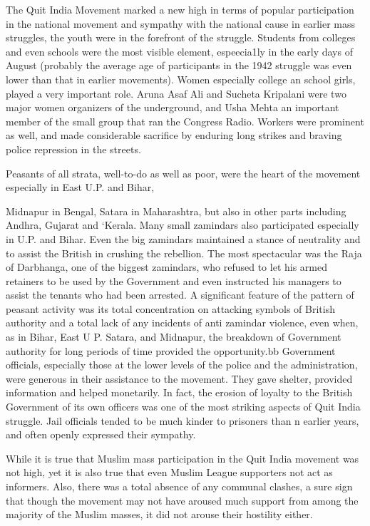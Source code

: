 The Quit India Movement marked a new high in terms of popular participation in the national movement and sympathy with the national cause in earlier mass struggles, the youth were in the forefront of the struggle. Students from colleges and even schools were the most visible element, espeecia1ly in the early days of August (probably the average age of participants in the 1942 struggle was even lower than that in earlier movements). Women especially college an school girls, played a very important role. Aruna Asaf Ali and Sucheta Kripalani were two major women organizers of the underground, and Usha Mehta an important member of the small group that ran the Congress Radio. Workers were prominent as well, and made considerable sacrifice by enduring long strikes and braving police repression in the streets.

Peasants of all strata, well-to-do as well as poor, were the heart of the movement especially in East U.P. and Bihar,

Midnapur in Bengal, Satara in Maharashtra, but also in other parts including Andhra, Gujarat and ‘Kerala. Many small zamindars also participated especially in U.P. and Bihar. Even the big zamindars maintained a stance of neutrality and to assist the British in crushing the rebellion. The most spectacular was the Raja of Darbhanga, one of the biggest zamindars, who refused to let his armed retainers to be used by the Government and even instructed his managers to assist the tenants who had been arrested. A significant feature of the pattern of peasant activity was its total concentration on attacking symbols of British authority and a total lack of any incidents of anti­ zamindar violence, even when, as in Bihar, East U P. Satara, and Midnapur, the breakdown of Government authority for long periods of time provided the opportunity.bb Government officials, especially those at the lower levels of the police and the administration, were generous in their assistance to the movement. They gave shelter, provided information and helped monetarily. In fact, the erosion of loyalty to the British Government of its own officers was one of the most striking aspects of Quit India struggle. Jail officials tended to be much kinder to prisoners than n earlier years, and often openly expressed their sympathy.

While it is true that Muslim mass participation in the Quit India movement was not high, yet it is also true that even Muslim League supporters not act as informers. Also, there was a total absence of any communal clashes, a sure sign that though the movement may not have aroused much support from among the majority of the Muslim masses, it did not arouse their hostility either.

